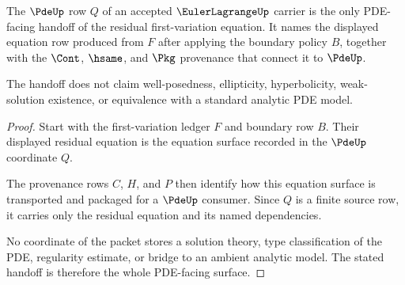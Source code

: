 \begin{theorem}
\label{thm:eulerlagrange-pde-source-handoff}
The $\PdeUp$ row $Q$ of an accepted $\EulerLagrangeUp$ carrier is the only PDE-facing handoff of the residual first-variation equation. It names the displayed equation row produced from $F$ after applying the boundary policy $B$, together with the $\Cont$, $\hsame$, and $\Pkg$ provenance that connect it to $\PdeUp$.

The handoff does not claim well-posedness, ellipticity, hyperbolicity, weak-solution existence, or equivalence with a standard analytic PDE model.
\end{theorem}
\begin{proof}
Start with the first-variation ledger $F$ and boundary row $B$. Their displayed residual equation is the equation surface recorded in the $\PdeUp$ coordinate $Q$.

The provenance rows $C$, $H$, and $P$ then identify how this equation surface is transported and packaged for a $\PdeUp$ consumer. Since $Q$ is a finite source row, it carries only the residual equation and its named dependencies.

No coordinate of the packet stores a solution theory, type classification of the PDE, regularity estimate, or bridge to an ambient analytic model. The stated handoff is therefore the whole PDE-facing surface.
\end{proof}

